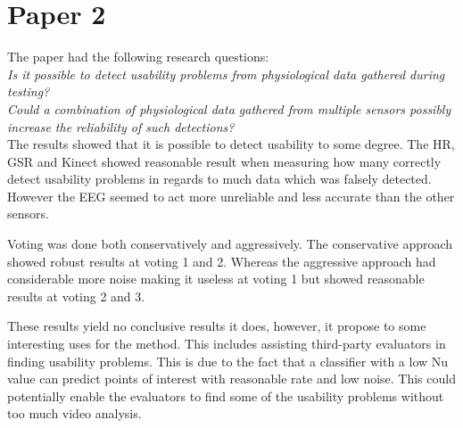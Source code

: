 \section{Paper 2}
The paper had the following research questions:\\

\textit{Is it possible to detect usability problems from physiological data gathered during testing?}\\

\textit{Could a combination of physiological data gathered from multiple sensors possibly increase the reliability of such detections?}\\

The results showed that it is possible to detect usability to some degree. 
The HR, GSR and Kinect showed reasonable result when measuring how many correctly detect usability problems in regards to much data which was falsely detected. However the EEG seemed to act more unreliable and less accurate than the other sensors.

Voting was done both conservatively and aggressively.
The conservative approach showed robust results at voting 1 and 2. Whereas the aggressive approach had considerable more noise making it useless at voting 1 but showed reasonable results at voting 2 and 3.

These results yield no conclusive results it does, however, it propose to some interesting uses for the method.
This includes assisting third-party evaluators in finding usability problems. This is due to the fact that a classifier with a low Nu value can predict points of interest with reasonable rate and low noise.
This could potentially enable the evaluators to find some of the usability problems without too much video analysis.